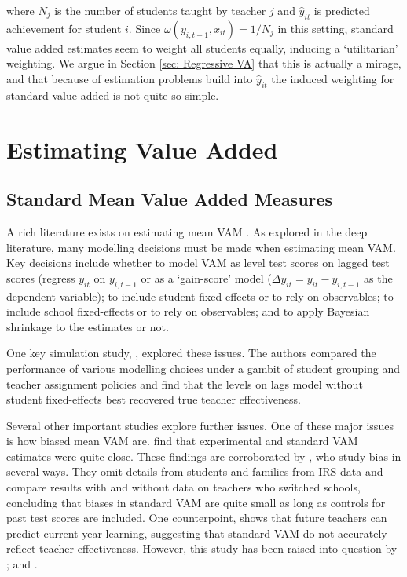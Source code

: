 \documentclass[letterpaper,12pt]{article}
\begin{document}
\noindent where $N_j$ is the number of students taught by teacher $j$ and $\hat{y}_{it}$ is predicted achievement for student $i$. Since $\omega(y_{i,t-1}, x_{it}) = 1/N_j$ in this setting, standard value added estimates seem to weight all students equally, inducing a `utilitarian' weighting. We argue in Section \ref{sec: Regressive VA} that this is actually a mirage, and that because of estimation problems build into $\hat{y}_{it}$ the induced weighting for standard value added is not quite so simple.




\section{Estimating Value Added}\label{sec: Estimation}

\subsection{Standard Mean Value Added Measures}

A rich literature exists on estimating mean VAM \citep[see, for example,][]{Koedel2015,chetty2014measuring1,guarino2015can,guarino2015evaluation, dieterle2015principals}. As explored in the deep literature, many modelling decisions must be made when estimating mean VAM. Key decisions include whether to model VAM as level test scores on lagged test scores (regress $y_{it}$ on $y_{i,t-1}$ or as a `gain-score' model ($\Delta y_{it} = y_{it} - y_{i,t-1}$ as the dependent variable); to include student fixed-effects or to rely on observables; to include school fixed-effects or to rely on observables; and to apply Bayesian shrinkage to the estimates or not.

One key simulation study, \cite{guarino2015can}, explored these issues. The authors compared the performance of various modelling choices under a gambit of student grouping and teacher assignment policies and find that the levels on lags model without student fixed-effects best recovered true teacher effectiveness.

Several other important studies explore further issues. One of these major issues is how biased mean VAM are. \cite{kane2013have} find that experimental and standard VAM estimates were quite close. These findings are corroborated by \cite{chetty2014measuring1}, who study bias in several ways. They omit details from students and families from IRS data and compare results with and without data on teachers who switched schools, concluding that biases in standard VAM are quite small as long as controls for past test scores are included. One counterpoint, \cite{rothstein2010teacher} shows that future teachers can predict current year learning, suggesting that standard VAM do not accurately reflect teacher effectiveness. However, this study has been raised into question by \cite{goldhaber2015assessing, koedel2011does}; and \cite{guarino2015can}.
\end{document}
